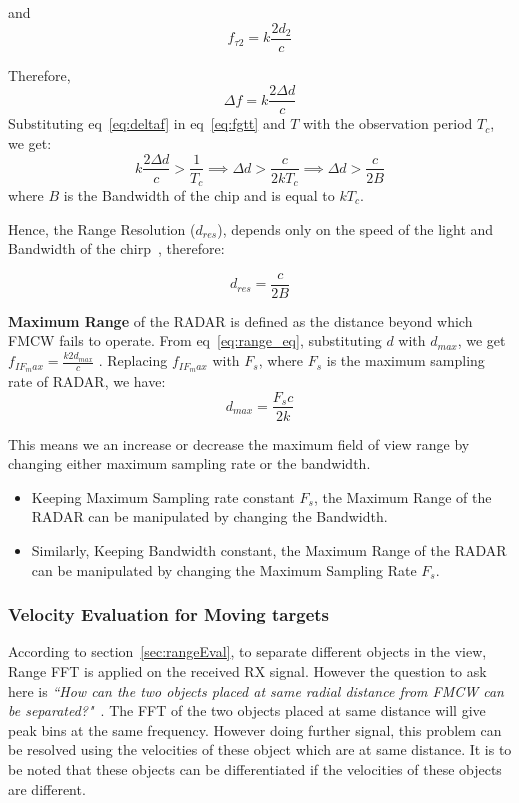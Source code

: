  and
  \begin{equation}
   f_{\tau2}= k\frac{2d_{2}}{c}
 \end{equation} 
 
 Therefore, 
 \begin{equation}\label{eq:deltaf}
     \Delta f = k\frac{2\Delta d}{c}
 \end{equation}
Substituting eq~\eqref{eq:deltaf} in eq~\eqref{eq:fgtt} and \(T\) with the observation period $T_{c}$, we get:
\begin{equation}
  k\frac{2\Delta d}{c} > \frac{1}{T_{c}}  \implies \Delta d > \frac{c}{2kT_{c}} \implies \Delta d > \frac{c}{2B}  
\end{equation}
where $B$ is the Bandwidth of the chip and is equal to $kT_{c}$.

Hence, the Range Resolution ($d_{res}$), depends only on the speed of the light and Bandwidth of the chirp~\cite{rao_2017}, therefore:

\begin{equation}
   d_{res} = \frac{c}{2B} 
\end{equation}

\textbf{Maximum Range} of the RADAR is defined as the distance beyond which FMCW fails to operate. From eq~\eqref{eq:range_eq}, substituting $d$ with $d_{max}$, we get \(f_{IF_max} = \frac{k2d_{max}}{c}\) . Replacing $f_{IF_max}$ with $F_{s}$, where $F_{s}$ is the maximum sampling rate of RADAR, we have:
\begin{equation}
    d_{max}= \frac{F_{s}c}{2k}
\end{equation}

This means we an increase or decrease the maximum field of view range by changing either maximum sampling rate or the bandwidth.
\begin{itemize}
    \item Keeping Maximum Sampling rate constant $F_{s}$, the Maximum Range of the RADAR can be manipulated by changing the Bandwidth.
    \item Similarly,  Keeping Bandwidth constant, the Maximum Range of the RADAR can be manipulated by changing the Maximum Sampling Rate $F_{s}$.
\end{itemize}



\subsubsection*{Velocity Evaluation for Moving targets}
According to section~\ref{sec:rangeEval}, to separate different objects in the view, Range FFT is applied on the received RX signal. However the question to ask here is \textit{``How can the two objects placed at same radial distance from FMCW can be separated?"}~\cite{rao_2017}. The FFT of the two objects placed at same distance will give peak bins at the same frequency. However doing further signal, this problem can be resolved using the velocities of these object which are at same distance. It is to be noted that these objects can be differentiated if the velocities of these objects are different.

